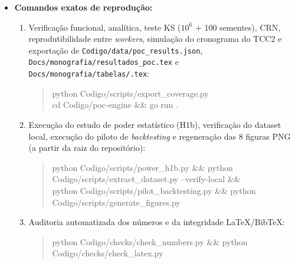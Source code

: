 \documentclass[12pt,openany,oneside,a4paper,english,brazilian,sumario=tradicional]{abntex2}
\begin{document}
\begin{apendicesenv}
\begin{itemize}
\begin{itemize}
    \item \texttt{Codigo/\allowbreak checks/\allowbreak }\allowbreak\texttt{check\_\allowbreak latex.py} e \texttt{Codigo/\allowbreak checks/\allowbreak }\allowbreak\texttt{check\_\allowbreak numbers.py}: \textit{scripts} automatizados de auditoria que verificam a ausência de \textit{warnings} de referências/\allowbreak citações, posicionamento seguro dos fragmentos de tabela, isolamento do pacote Overleaf e a sincronia numérica exata entre \texttt{Codigo/\allowbreak data/\allowbreak *.json} e o texto LaTeX.
  \end{itemize}
  \item \textbf{Comandos exatos de reprodução:}
  \begin{enumerate}
    \item Verificação funcional, analítica, teste KS ($10^6$ + 100 sementes), CRN, reprodutibilidade entre \textit{workers}, simulação do cronograma do TCC2 e exportação de \texttt{Codigo/\allowbreak data/\allowbreak poc\_\allowbreak results.json}, \texttt{Docs/\allowbreak monografia/\allowbreak resultados\_\allowbreak poc.tex} e \texttt{Docs/\allowbreak monografia/\allowbreak tabelas/\allowbreak *.tex}:
    \begin{quote}\small\raggedright\ttfamily
    python Codigo/scripts/export\_coverage.py\\
    cd Codigo/poc-engine \&\& go run .
    \end{quote}
    \item Execução do estudo de poder estatístico (H1b), verificação do dataset local, execução do piloto de \textit{backtesting} e regeneração das 8 figuras PNG (a partir da raiz do repositório):
    \begin{quote}\small\raggedright\ttfamily
    python Codigo/scripts/power\_h1b.py \&\& python Codigo/scripts/extract\_dataset.py --verify-local \&\&\\
    python Codigo/scripts/pilot\_backtesting.py \&\& python Codigo/scripts/generate\_figures.py
    \end{quote}
    \item Auditoria automatizada dos números e da integridade LaTeX/\allowbreak BibTeX:
    \begin{quote}\small\raggedright\ttfamily
    python Codigo/checks/check\_numbers.py \&\& python Codigo/checks/check\_latex.py
    \end{quote}
  \end{enumerate}
\end{itemize}

\end{apendicesenv}
\end{document}
